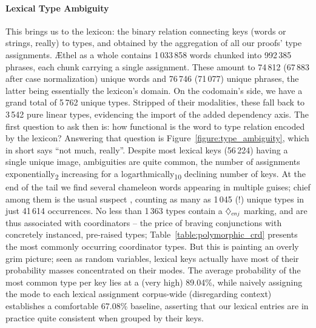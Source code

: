 \paragraph{Lexical Type Ambiguity}
This brings us to the lexicon: the binary relation connecting keys (words or strings, really) to types, and obtained by the aggregation of all our proofs' type assignments.
\AE thel as a whole contains 1\,033\,858 words chunked into 992\,385 phrases, each chunk carrying a single assignment.
These amount to  74\,812 (67\,883 after case normalization) unique words and 76\,746 (71\,077) unique phrases, the latter being essentially the lexicon's domain.
On the codomain's side, we have a grand total of 5\,762 unique \LPplus{} types.
Stripped of their modalities, these fall back to 3\,542 pure linear types, evidencing the import of the added dependency axis.
The first question to ask then is: how functional is the word to type relation encoded by the lexicon?
Answering that question is Figure~\ref{figure:type_ambiguity}, which in short says ``not much, really''.
Despite most lexical keys (56\,224) having a single unique image, ambiguities are quite common, the number of assignments exponentially\textsubscript{2} increasing for a logarthmically\textsubscript{10} declining number of keys.
At the end of the tail we find several chameleon words appearing in multiple guises; chief among them is the usual suspect , counting as many as 1\,045 (!) unique types in just 41\,614 occurrences.
No less than 1\,363 types contain a $\ddia{cnj}$ marking, and are thus associated with coordinators -- the price of braving conjunctions with concretely instanced, pre-raised types; Table~\ref{table:polymorphic_crd} presents the most commonly occurring coordinator types.
But this is painting an overly grim picture; seen as random variables, lexical keys actually have most of their probability masses concentrated on their modes.
The average probability of the most common type per key lies at a (very high) 89.04\%, while naively assigning the mode to each lexical assignment corpus-wide (disregarding context) establishes a comfortable 67.08\% baseline, asserting that our lexical entries are in practice quite consistent when grouped by their keys.


